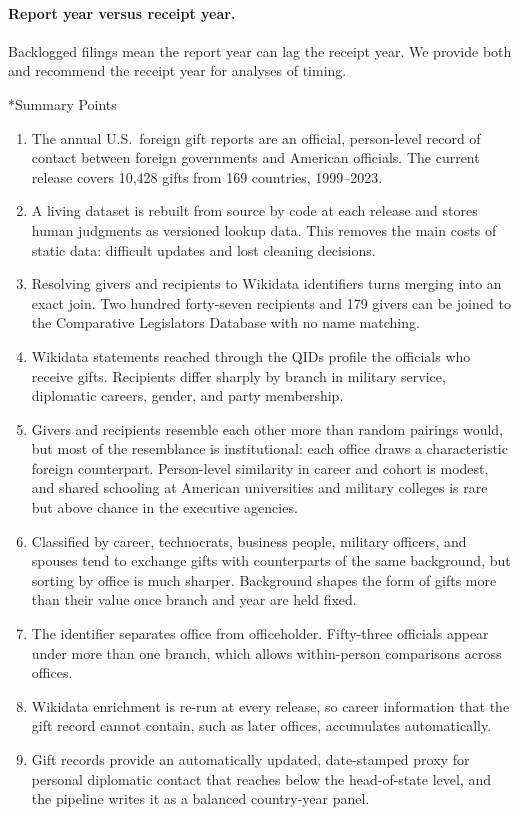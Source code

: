 \documentclass[11pt]{article}
\makeatletter
\renewcommand\section{\@startsection{section}{1}{\z@}{-3.0ex plus -1ex minus -.2ex}{1.5ex plus .2ex}{\normalfont\large\bfseries\MakeUppercase}}
\newcommand{\ngifts}{10,428}
\makeatother
\begin{document}
\paragraph{Report year versus receipt year.} Backlogged filings mean the report year can lag the receipt year. We provide both and recommend the receipt year for analyses of timing.

\section*{Summary Points}
\begin{enumerate}
\item The annual U.S.\ foreign gift reports are an official, person-level record of contact between foreign governments and American officials. The current release covers \ngifts{} gifts from 169 countries, 1999--2023.
\item A living dataset is rebuilt from source by code at each release and stores human judgments as versioned lookup data. This removes the main costs of static data: difficult updates and lost cleaning decisions.
\item Resolving givers and recipients to Wikidata identifiers turns merging into an exact join. Two hundred forty-seven recipients and 179 givers can be joined to the Comparative Legislators Database with no name matching.
\item Wikidata statements reached through the QIDs profile the officials who receive gifts. Recipients differ sharply by branch in military service, diplomatic careers, gender, and party membership.
\item Givers and recipients resemble each other more than random pairings would, but most of the resemblance is institutional: each office draws a characteristic foreign counterpart. Person-level similarity in career and cohort is modest, and shared schooling at American universities and military colleges is rare but above chance in the executive agencies.
\item Classified by career, technocrats, business people, military officers, and spouses tend to exchange gifts with counterparts of the same background, but sorting by office is much sharper. Background shapes the form of gifts more than their value once branch and year are held fixed.
\item The identifier separates office from officeholder. Fifty-three officials appear under more than one branch, which allows within-person comparisons across offices.
\item Wikidata enrichment is re-run at every release, so career information that the gift record cannot contain, such as later offices, accumulates automatically.
\item Gift records provide an automatically updated, date-stamped proxy for personal diplomatic contact that reaches below the head-of-state level, and the pipeline writes it as a balanced country-year panel.
\end{enumerate}
\end{document}
